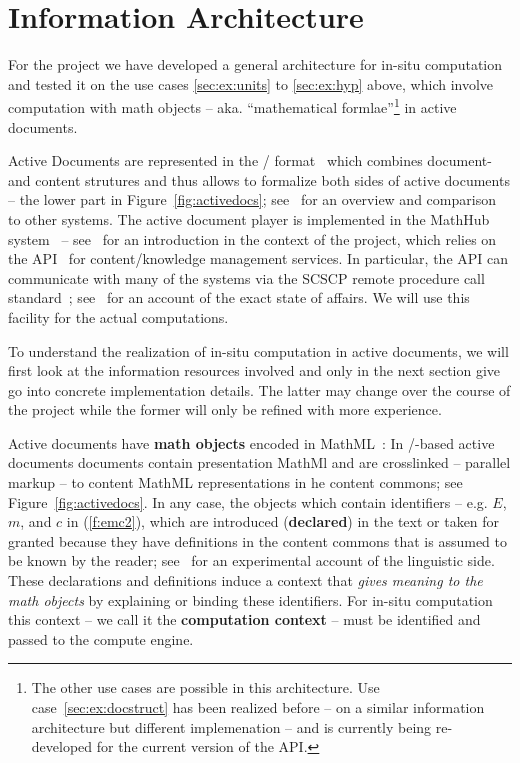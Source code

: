\section{Information Architecture}\label{sec:infarch}

For the \pn project we have developed a general architecture for in-situ computation and
tested it on the use cases \ref{sec:ex:units} to \ref{sec:ex:hyp} above, which involve
computation with math objects -- aka. ``mathematical formlae''\footnote{The other use
  cases are possible in this architecture. Use case~\ref{sec:ex:docstruct} has been
  realized before -- on a similar information architecture but different implemenation --
  and is currently being re-developed for the current version of the \mmt API.} in active
documents.

Active Documents are represented in the \omdoc/\mmt
format~\cite{Kohlhase:OMDoc1.2,uniformal:on,Iancu:phd} which combines document- and
content strutures and thus allows to formalize both sides of active documents -- the lower
part in Figure~\ref{fig:activedocs}; see~\cite{ODK-D4.2} for an overview and comparison to
other \pn systems. The active document player is implemented in the MathHub
system~\cite{MathHub:on} -- see~\cite{ODK-D4.3} for an introduction in the context of the
\pn project, which relies on the \mmt API~\cite{Rabe:MAGMS13,uniformal:on} for
content/knowledge management services. In particular, the \mmt API can communicate with
many of the \pn systems via the SCSCP remote procedure call
standard~\cite{HHKLRAT:SCSCP10}; see~\cite{ODK-D3.3} for an account of the exact state of
affairs. We will use this facility for the actual computations.

To understand the realization of in-situ computation in active documents, we will first
look at the information resources involved and only in the next section give go into
concrete implementation details. The latter may change over the course of the \pn project
while the former will only be refined with more experience.

Active documents have \textbf{math objects} encoded in
MathML~\cite{CarlisleEd:MathML3:base}: In \omdoc/\mmt-based active documents documents
contain presentation MathMl and are crosslinked -- parallel markup -- to content MathML
representations in he content commons; see Figure~\ref{fig:activedocs}. In any case, the
objects which contain identifiers -- e.g. $E$, $m$, and $c$ in (\ref{f:emc2}), which are
introduced (\textbf{declared}) in the text or taken for granted because they have
definitions in the content commons that is assumed to be known by the reader;
see~\cite{WolGriKoh:udc11} for an experimental account of the linguistic side. These
declarations and definitions induce a context that \emph{gives meaning to the math
  objects} by explaining or binding these identifiers. For in-situ computation this
context -- we call it the \textbf{computation context} -- must be identified and passed to
the compute engine.

